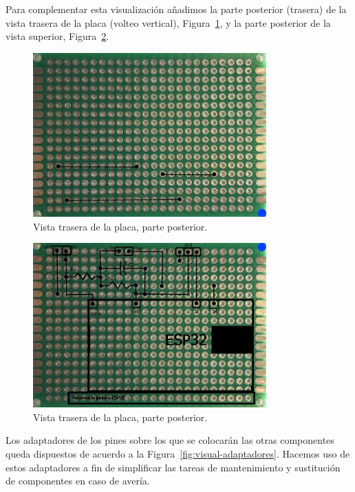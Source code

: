 \documentclass[a4paper,10pt]{article}
\begin{document}
Para complementar esta visualización añadimos la parte posterior (trasera) de la
vista trasera de la placa (volteo vertical), Figura~\ref{fig:placa-tras-inf},
y la parte posterior de la vista superior, Figura~\ref{fig:placa-sup-inf}.

\begin{figure}
  \centering
  \includegraphics[width=0.8\textwidth]{img/dibujo_placa_vista_inferior_parte_trasera.png}
  \caption{Vista trasera de la placa, parte posterior.}\label{fig:placa-tras-inf}
\end{figure}

\begin{figure}
  \centering
  \includegraphics[width=0.8\textwidth]{img/dibujo_placa_vista_superior_parte_trasera.png}
  \caption{Vista trasera de la placa, parte posterior.}\label{fig:placa-sup-inf}
\end{figure}

Los adaptadores de los pines sobre los que se colocarán las otras
componentes queda dispuestos de acuerdo a la
Figura~\ref{fig:visual-adaptadores}. Hacemos uso de estos adaptadores
a fin de simplificar las tareas de mantenimiento y sustitución de
componentes en caso de avería.
\end{document}
